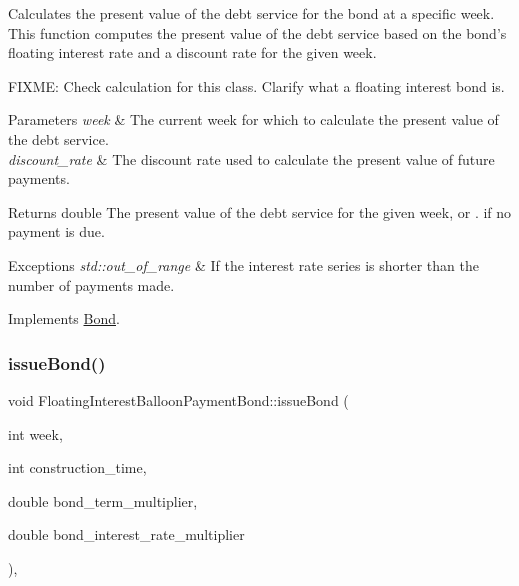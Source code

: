 Calculates the present value of the debt service for the bond at a specific week. This function computes the present value of the debt service based on the bond’s floating interest rate and a discount rate for the given week. 

F\+I\+X\+ME\+: Check calculation for this class. Clarify what a floating interest bond is. 
\begin{DoxyParams}{Parameters}
{\em week} & The current week for which to calculate the present value of the debt service. \\
\hline
{\em discount\+\_\+rate} & The discount rate used to calculate the present value of future payments.\\
\hline
\end{DoxyParams}
\begin{DoxyReturn}{Returns}
double The present value of the debt service for the given week, or {.} if no payment is due.
\end{DoxyReturn}

\begin{DoxyExceptions}{Exceptions}
{\em std\+::out\+\_\+of\+\_\+range} & If the interest rate series is shorter than the number of payments made. \\
\hline
\end{DoxyExceptions}


Implements \mbox{\hyperlink{classBond_a322d4ab0c0c72824ac4df5df80f14d24}{Bond}}.

\mbox{\label{classFloatingInterestBalloonPaymentBond_a4cf110f320c92f5eca9aed952e0b527a}} 
\subsubsection{\texorpdfstring{issue\+Bond()}{issueBond()}}
{\footnotesize\ttfamily void Floating\+Interest\+Balloon\+Payment\+Bond\+::issue\+Bond (\begin{DoxyParamCaption}\item[{int}]{week,  }\item[{int}]{construction\+\_\+time,  }\item[{double}]{bond\+\_\+term\+\_\+multiplier,  }\item[{double}]{bond\+\_\+interest\+\_\+rate\+\_\+multiplier }\end{DoxyParamCaption})\hspace{0.3cm}{\ttfamily [override]}, {\ttfamily [virtual]}}



